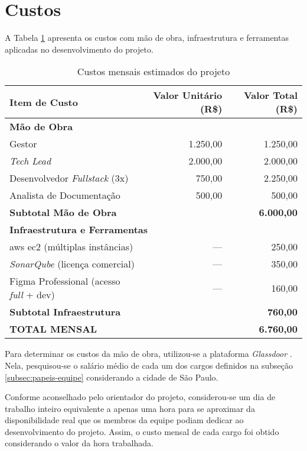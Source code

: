 \section{Custos}

\label{sec:custos}

A Tabela \ref{tab:custo-mensal-projeto} apresenta os custos com mão de obra, infraestrutura e ferramentas aplicadas no desenvolvimento do projeto.

\begin{table}[htbp]
	\centering
	\caption{Custos mensais estimados do projeto}
	\label{tab:custo-mensal-projeto}
	\begin{tabular}{lrr}
		\toprule
		\textbf{Item de Custo} & \textbf{Valor Unitário (R\$)} & \textbf{Valor Total (R\$)} \\
		\midrule
		\multicolumn{3}{l}{\textbf{Mão de Obra}} \\
		\quad Gestor & 1.250,00 & 1.250,00 \\
		\quad \emph{Tech Lead} & 2.000,00 & 2.000,00 \\
		\quad Desenvolvedor \emph{Fullstack} (3x) & 750,00 & 2.250,00 \\
		\quad Analista de Documentação & 500,00 & 500,00 \\
		\cmidrule{3-3}
		\multicolumn{2}{l}{\textbf{Subtotal Mão de Obra}} & \textbf{6.000,00} \\
		\midrule
		\multicolumn{3}{l}{\textbf{Infraestrutura e Ferramentas}} \\
		\quad \gls{aws} \gls{ec2} (múltiplas instâncias) & --- & 250,00 \\
		\quad \emph{SonarQube} (licença comercial) & --- & 350,00 \\
		\quad Figma Professional (acesso \emph{full} + dev) & --- & 160,00 \\
		\cmidrule{3-3}
		\multicolumn{2}{l}{\textbf{Subtotal Infraestrutura}} & \textbf{760,00} \\
		\midrule
		\multicolumn{2}{l}{\textbf{TOTAL MENSAL}} & \textbf{6.760,00} \\
		\bottomrule
	\end{tabular}
\end{table}

Para determinar os custos da mão de obra, utilizou-se a plataforma \emph{Glassdoor} \cite{glassdoor-2025}. Nela, pesquisou-se o salário médio de cada um dos cargos definidos na subseção \ref{subsec:papeis-equipe} considerando a cidade de São Paulo.

Conforme aconselhado pelo orientador do projeto, considerou-se um dia de trabalho inteiro equivalente a apenas uma hora para se aproximar da disponibilidade real que os membros da equipe podiam dedicar ao desenvolvimento do projeto. Assim, o custo mensal de cada cargo foi obtido considerando o valor da hora trabalhada.

